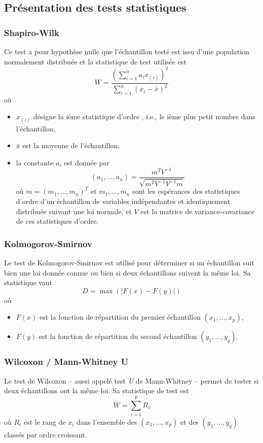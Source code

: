 	
		\subsection{Présentation des tests statistiques}
			\subsubsection{Shapiro-Wilk}
				Ce test a pour hypothèse nulle que l'échantillon testé est issu d'une population normalement distribuée et la statistique de test utilisée est
			\[
			W = \frac{\left(\sum_{i=1}^{n}a_ix_{(i)}\right)^2}{\sum_{i=1}^{n}\left(x_i-\bar{x}\right)^2}
			\]
			où
			\begin{itemize}
				\item $x_{(i)}$ désigne la ième statistique d'ordre , i.e., le ième plus petit nombre dans l'échantillon,
				\item $\bar{x}$ est la moyenne de l'échantillon,
				\item la constante $a_i$ est donnée par
					\[ (a_1, …, a_n) = \frac{m^TV^{-1}}{\sqrt{m^TV^{-1}V^{-1}m}} \]
					où $m = (m_1, …, m_n)^T$ et $m_1, …, m_n$ sont les espérances des statistiques d'ordre d'un échantillon de variables indépendantes et identiquement distribuée suivant une loi normale, et $V$ est la matrice de variance-covariance de ces statistiques d'ordre.
			\end{itemize}
			
			
			\subsubsection{Kolmogorov-Smirnov}
				Le test de Kolmogorov-Smirnov est utilisé pour déterminer si un échantillon suit bien une loi donnée connue ou bien si deux échantillons suivent la même loi. Sa statistique  vaut
			\[ D = \max\left(|F(x) - F(y)|\right)\]
			où
			\begin{itemize}
				\item $F(x)$ est la fonction de répartition du premier échantillon $(x_1, …, x_p)$,
				\item $F(y)$ est la fonction de répartition du second échantillon $(y_1, …, y_q)$.
			\end{itemize}
			
			
			\subsubsection{Wilcoxon / Mann-Whitney U}
				Le test de Wilcoxon -- aussi appelé test \emph{U} de Mann-Whitney -- permet de tester si deux échantillons ont la même loi. Sa statistique de test est
			\[ W = \sum_{i=1}^pR_i \]
			où $R_i$ est le rang de $x_i$ dans l'ensemble des $(x_1, …, x_p)$ et des $(y_1, …, y_q)$ classés par ordre croissant.

